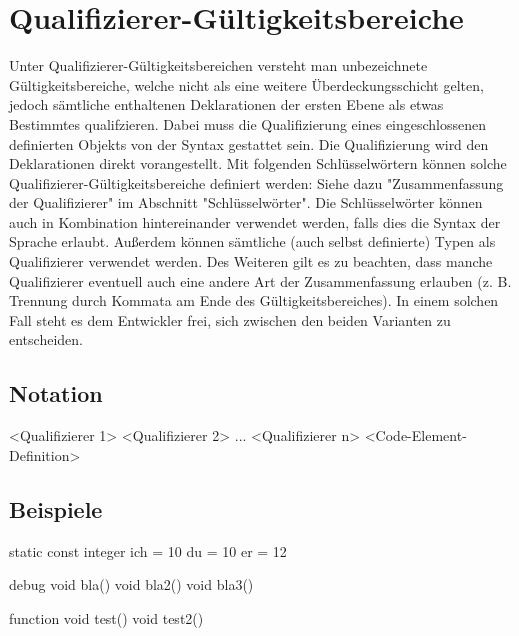 \chapter{Qualifizierer-Gültigkeitsbereiche}
Unter Qualifizierer-Gültigkeitsbereichen versteht man unbezeichnete Gültigkeitsbereiche,
welche nicht als eine weitere Überdeckungsschicht gelten, jedoch sämtliche enthaltenen Deklarationen der ersten Ebene
als etwas Bestimmtes qualifzieren.
Dabei muss die Qualifizierung eines eingeschlossenen definierten Objekts von der Syntax gestattet sein.
Die Qualifizierung wird den Deklarationen direkt vorangestellt.
Mit folgenden Schlüsselwörtern können solche Qualifizierer-Gültigkeitsbereiche definiert werden:
Siehe dazu "Zusammenfassung der Qualifizierer" im Abschnitt "Schlüsselwörter".
Die Schlüsselwörter können auch in Kombination hintereinander verwendet werden, falls dies die Syntax der Sprache
erlaubt.
Außerdem können sämtliche (auch selbst definierte) Typen als Qualifizierer verwendet werden.
Des Weiteren gilt es zu beachten, dass manche Qualifizierer eventuell auch eine andere Art der Zusammenfassung erlauben
(z. B. Trennung durch Kommata am Ende des Gültigkeitsbereiches).
In einem solchen Fall steht es dem Entwickler frei, sich zwischen den beiden Varianten zu entscheiden.

\section{Notation}
<Qualifizierer 1> <Qualifizierer 2> ... <Qualifizierer n>
	<Code-Element-Definition>

\section{Beispiele}
static const integer
	ich = 10
	du = 10
	er = 12

debug
	void bla()
	void bla2()
	void bla3()

function
	void test()
	void test2()